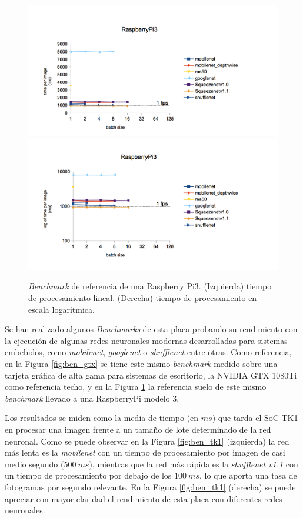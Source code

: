 \begin{figure}[htp]
    \centering
    \captionsetup{justification=centering}
    \includegraphics[width=.5\textwidth]{img/Raspi_linear.png}\hfill
    \includegraphics[width=.5\textwidth]{img/Raspi_log.png}
    \caption{\textit{Benchmark} de referencia de una Raspberry Pi3. (Izquierda) tiempo de procesamiento lineal. (Derecha) tiempo de procesamiento en escala logarítmica.}
    \label{fig:ben_pi}
\end{figure}

Se han realizado algunos \textit{Benchmarks} de esta placa probando su rendimiento con la ejecución de algunas redes neuronales modernas desarrolladas para sistemas embebidos, como \textit{mobilenet}, \textit{googlenet} o \textit{shufflenet} entre otras. Como referencia, en la Figura \ref{fig:ben_gtx} se tiene este mismo \textit{benchmark} medido sobre una tarjeta gráfica de alta gama para sistemas de escritorio, la NVIDIA GTX 1080Ti como referencia techo, y en la Figura \ref{fig:ben_pi} la referencia suelo de este mismo \textit{benchmark} llevado a una RaspberryPi modelo 3.

Los resultados se miden como la media de tiempo (en $ms$) que tarda el SoC TK1 en procesar una imagen frente a un tamaño de lote determinado de la red neuronal. Como se puede observar en la Figura \ref{fig:ben_tk1} (izquierda) la red más lenta es la \textit{mobilenet} con un tiempo de procesamiento por imagen de casi medio segundo ($500\ ms$), mientras que la red más rápida es la \textit{shufflenet v1.1} con un tiempo de procesamiento por debajo de los $100\ ms$, lo que aporta una tasa de fotogramas por segundo relevante. En la Figura \ref{fig:ben_tk1} (derecha) se puede apreciar con mayor claridad el rendimiento de esta placa con diferentes redes neuronales.

